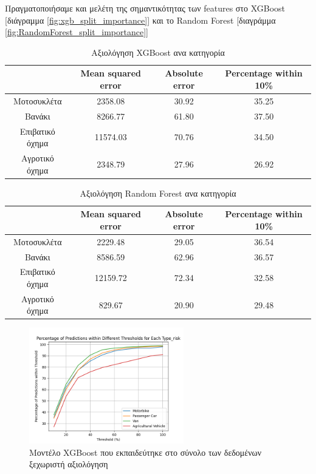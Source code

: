 \documentclass{llncs}
\begin{document}
Πραγματοποιήσαμε και μελέτη της σημαντικότητας των features 
στο XGBoost [διάγραμμα \ref{fig:xgb_split_importance}] και 
το Random Forest [διαγράμμα \ref{fig:RandomForest_split_importance}]

\begin{table}
    \centering
    \begin{tabular}{|c|c|c|c|} %
        \hline
         &Mean squared error & Absolute error & Percentage within 10\% \\ %
        \hline
        Μοτοσυκλέτα & 2358.08 & 30.92 & 35.25 \\
        Βανάκι & 8266.77 & 61.80 & 37.50 \\
        Επιβατικό όχημα & 11574.03 & 70.76 & 34.50 \\
        Αγροτικό όχημα & 2348.79 & 27.96 & 26.92 \\
        \hline
    \end{tabular}
    \caption{Αξιολόγηση XGBoost ανα κατηγορία}
    \label{tab:XGBoost_cat_together}
\end{table}

\begin{table}
    \centering
    \begin{tabular}{|c|c|c|c|} %
        \hline
         &Mean squared error & Absolute error & Percentage within 10\% \\ %
        \hline
        Μοτοσυκλέτα & 2229.48 & 29.05 & 36.54 \\
        Βανάκι & 8586.59 & 62.96 & 36.57 \\
        Επιβατικό όχημα & 12159.72 & 72.34 & 32.58 \\
        Αγροτικό όχημα & 829.67 & 20.90 & 29.48 \\
        \hline
    \end{tabular}
    \caption{Αξιολόγηση Random Forest ανα κατηγορία}
    \label{tab:RandomForest_cat_together}
\end{table}


\begin{figure}
    \begin{center}
        \includegraphics[width=0.6\textwidth]{images/combined_trained_individual_thresholds_xgb.png}
    \end{center}
    \caption{Μοντέλο XGBoost που εκπαιδεύτηκε στο σύνολο των δεδομένων ξεχωριστή αξιολόγηση}  
    \label{fig:XGBoost_result_all_individual}  
\end{figure}
\end{document}
